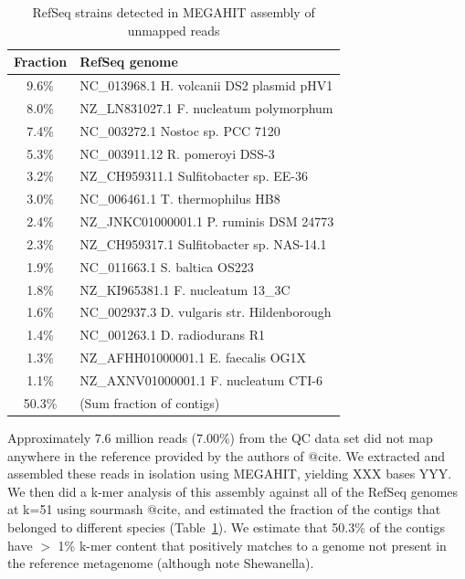 \documentclass[10pt,a4paper,twocolumn]{article}
\begin{document}

\begin{table}[t]
\caption{RefSeq strains detected in MEGAHIT assembly of unmapped reads}
\centering
\begin{tabular}{|c|l|}
\hline

\textbf{Fraction}& \textbf{RefSeq genome} \\ [0.5ex] %
\hline

9.6\% & {\small NC\_013968.1 H. volcanii DS2 plasmid pHV1} \\
\hline
8.0\% & {\small NZ\_LN831027.1 F. nucleatum polymorphum} \\
\hline
7.4\% & {\small NC\_003272.1 Nostoc sp. PCC 7120} \\
\hline
5.3\% & {\small NC\_003911.12 R. pomeroyi DSS-3} \\
\hline
3.2\% & {\small NZ\_CH959311.1 Sulfitobacter sp. EE-36} \\
\hline
3.0\% & {\small NC\_006461.1 T. thermophilus HB8} \\
\hline
2.4\% & {\small NZ\_JNKC01000001.1 P. ruminis DSM 24773} \\
\hline
2.3\% & {\small NZ\_CH959317.1 Sulfitobacter sp. NAS-14.1} \\
\hline
1.9\% & {\small NC\_011663.1 S. baltica OS223} \\
\hline
1.8\% & {\small NZ\_KI965381.1 F. nucleatum 13\_3C} \\
\hline
1.6\% & {\small NC\_002937.3 D. vulgaris str. Hildenborough} \\
\hline
1.4\% & {\small NC\_001263.1 D. radiodurans R1} \\
\hline
1.3\% & {\small NZ\_AFHH01000001.1 E. faecalis OG1X} \\
\hline
1.1\% & {\small NZ\_AXNV01000001.1 F. nucleatum CTI-6} \\
\hline

50.3\% & {\small (Sum fraction of contigs)} \\
\hline

\end{tabular}
\label{table:gather}
\end{table}

Approximately 7.6 million reads (7.00\%) from the QC data set did not
map anywhere in the reference provided by the authors of @cite.  We
extracted and assembled these reads in isolation using MEGAHIT,
yielding XXX bases YYY.  We then did a k-mer analysis of this assembly
against all of the RefSeq genomes at k=51 using sourmash @cite, and
estimated the fraction of the contigs that belonged to different
species (Table~\ref{table:gather}). We estimate that 50.3\% of the
contigs have $>$ 1\% k-mer content that positively matches to a genome
not present in the reference metagenome (although note Shewanella).
\end{document}
